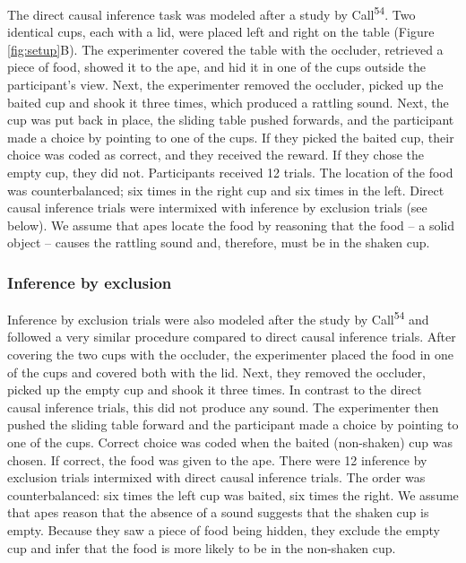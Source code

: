 \documentclass[
  man,floatsintext]{apa6}
\begin{document}
The direct causal inference task was modeled after a study by Call\textsuperscript{54}. Two identical cups, each with a lid, were placed left and right on the table (Figure \ref{fig:setup}B). The experimenter covered the table with the occluder, retrieved a piece of food, showed it to the ape, and hid it in one of the cups outside the participant's view. Next, the experimenter removed the occluder, picked up the baited cup and shook it three times, which produced a rattling sound. Next, the cup was put back in place, the sliding table pushed forwards, and the participant made a choice by pointing to one of the cups. If they picked the baited cup, their choice was coded as correct, and they received the reward. If they chose the empty cup, they did not. Participants received 12 trials. The location of the food was counterbalanced; six times in the right cup and six times in the left. Direct causal inference trials were intermixed with inference by exclusion trials (see below). We assume that apes locate the food by reasoning that the food -- a solid object -- causes the rattling sound and, therefore, must be in the shaken cup.

\hypertarget{inference-by-exclusion}{%
\subsubsection{Inference by exclusion}\label{inference-by-exclusion}}

Inference by exclusion trials were also modeled after the study by Call\textsuperscript{54} and followed a very similar procedure compared to direct causal inference trials. After covering the two cups with the occluder, the experimenter placed the food in one of the cups and covered both with the lid. Next, they removed the occluder, picked up the empty cup and shook it three times. In contrast to the direct causal inference trials, this did not produce any sound. The experimenter then pushed the sliding table forward and the participant made a choice by pointing to one of the cups. Correct choice was coded when the baited (non-shaken) cup was chosen. If correct, the food was given to the ape. There were 12 inference by exclusion trials intermixed with direct causal inference trials. The order was counterbalanced: six times the left cup was baited, six times the right. We assume that apes reason that the absence of a sound suggests that the shaken cup is empty. Because they saw a piece of food being hidden, they exclude the empty cup and infer that the food is more likely to be in the non-shaken cup.
\end{document}
